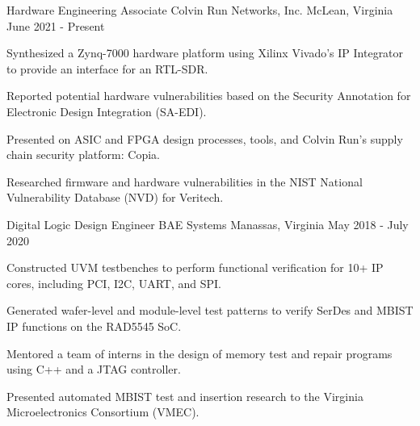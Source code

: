 \begin{cventries}


\cventry
{Hardware Engineering Associate} %
{Colvin Run Networks, Inc.} %
{McLean, Virginia} %
{June 2021 - Present} %
{
\begin{cvitems}
\item{Synthesized a Zynq-7000 hardware platform using Xilinx Vivado's IP Integrator to provide an interface for an RTL-SDR.}
\item{Reported potential hardware vulnerabilities based on the Security Annotation for Electronic Design Integration (SA-EDI).}
\item{Presented on ASIC and FPGA design processes, tools, and Colvin Run's supply chain security platform: Copia.}
\item{Researched firmware and hardware vulnerabilities in the NIST National Vulnerability Database (NVD) for Veritech.}
\end{cvitems}
}


\cventry
{Digital Logic Design Engineer} %
{BAE Systems} %
{Manassas, Virginia} %
{May 2018 - July 2020} %
{ %
\begin{cvitems}
\item {Constructed UVM testbenches to perform functional verification for 10+ IP cores, including PCI, I2C, UART, and SPI.}
\item {Generated wafer-level and module-level test patterns to verify SerDes and MBIST IP functions on the RAD5545 SoC.}
\item {Mentored a team of interns in the design of memory test and repair programs using C++ and a JTAG controller.}
\item{Presented automated MBIST test and insertion research to the Virginia Microelectronics Consortium (VMEC).} 
\end{cvitems}
}


\end{cventries}
